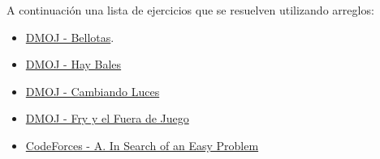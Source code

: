 A continuación una lista de ejercicios que se resuelven utilizando arreglos:

\begin{itemize}
	\item \href{https://dmoj.uclv.edu.cu/problem/bellotas} {DMOJ - Bellotas}.
	\item \href{https://dmoj.uclv.edu.cu/problem/haybales} {DMOJ - Hay Bales}
	\item \href{https://dmoj.uclv.edu.cu/problem/haybales} {DMOJ - Cambiando Luces}
	\item \href{https://dmoj.uclv.edu.cu/problem/fry}{DMOJ - Fry y el Fuera de Juego}
	\item \href{https://codeforces.com/problemset/problem/1030/A}{CodeForces - A. In Search of an Easy Problem}
\end{itemize}
